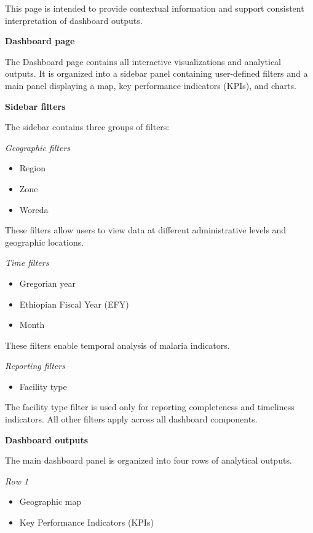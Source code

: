 \documentclass[
  letterpaper,
  DIV=11,
  numbers=noendperiod]{scrartcl}
\providecommand{\tightlist}{%
  \setlength{\itemsep}{0pt}\setlength{\parskip}{0pt}}
\begin{document}
This page is intended to provide contextual information and support
consistent interpretation of dashboard outputs.

\textbf{Dashboard page}

The Dashboard page contains all interactive visualizations and
analytical outputs. It is organized into a sidebar panel containing
user-defined filters and a main panel displaying a map, key performance
indicators (KPIs), and charts.

\textbf{Sidebar filters}

The sidebar contains three groups of filters:

\emph{Geographic filters}

\begin{itemize}
\tightlist
\item
  Region
\item
  Zone
\item
  Woreda
\end{itemize}

These filters allow users to view data at different administrative
levels and geographic locations.

\emph{Time filters}

\begin{itemize}
\tightlist
\item
  Gregorian year
\item
  Ethiopian Fiscal Year (EFY)
\item
  Month
\end{itemize}

These filters enable temporal analysis of malaria indicators.

\emph{Reporting filters}

\begin{itemize}
\tightlist
\item
  Facility type
\end{itemize}

The facility type filter is used only for reporting completeness and
timeliness indicators. All other filters apply across all dashboard
components.

\textbf{Dashboard outputs}

The main dashboard panel is organized into four rows of analytical
outputs.

\emph{Row 1}

\begin{itemize}
\tightlist
\item
  Geographic map
\item
  Key Performance Indicators (KPIs)
\end{itemize}
\end{document}
